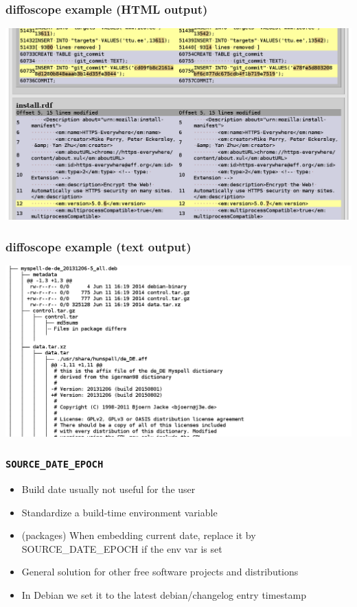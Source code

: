 \documentclass[14pt]{beamer}
\begin{document}
\begin{frame}
 \frametitle{diffoscope example (HTML output)}

 \begin{center}
  \includegraphics[width=0.9\paperwidth]{images/diffoscope_example_html.png}
 \end{center}
\end{frame}

\begin{frame}
 \frametitle{diffoscope example (text output)}

 \begin{center}
  \includegraphics[width=0.9\paperwidth]{images/diffoscope_example_text.png}
 \end{center}
\end{frame}

\begin{frame}
 \frametitle{\texttt{SOURCE\_DATE\_EPOCH}}

 \begin{itemize}
  \item Build date usually not useful for the user
  \item Standardize a build-time environment variable
  \item (packages) When embedding current date, replace it by SOURCE\_DATE\_EPOCH if the env var is set
  \item General solution for other free software projects and distributions
  \item In Debian we set it to the latest debian/changelog entry timestamp
 \end{itemize}
\end{frame}
\end{document}
